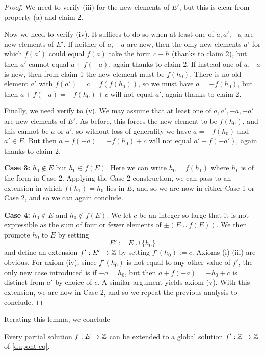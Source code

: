 \begin{proof}
We need to verify (iii) for the new elements of $E'$, but this is clear from property (a) and claim 2.

Now we need to verify (iv).  It suffices to do so when at least one of $a,a',-a$ are new elements of $E'$.  If neither of $a$, $-a$ are new, then the only new elements $a'$ for which $f(a')$ could equal $f(a)$ take the form $c-h$ (thanks to claim 2), but then $a'$ cannot equal $a+f(-a)$, again thanks to claim 2.  If instead one of $a, -a$ is new, then from claim 1 the new element must be $f(h_0)$.  There is no old element $a'$ with $f(a') = c = f(f(h_0))$, so we must have $a = -f(h_0)$, but then $a + f(-a) = -f(h_0)+c$ will not equal $a'$, again thanks to claim 2.

Finally, we need verify to (v).  We may assume that at least one of $a,a',-a,-a'$ are new elements of $E'$.  As before, this forces the new element to be $f(h_0)$, and this cannot be $a$ or $a'$, so without loss of generality we have $a = -f(h_0)$ and $a' \in E$.  But then $a + f(-a) = -f(h_0)+c$ will not equal $a' + f(-a')$, again thanks to claim 2.

{\bf Case 3:} $h_0 \not \in E$ but $h_0 \in f(E)$.  Here we can write $h_0 = f(h_1)$ where $h_1$ is of the form in Case 2.  Applying the Case 2 construction, we can pass to an extension in which $f(h_1) = h_0$ lies in $E$, and so we are now in either Case 1 or Case 2, and so we can again conclude.

{\bf Case 4:} $h_0 \not \in E$ and $h_0 \not \in f(E)$.  We let $c$ be an integer so large that it is not expressible as the sum of four or fewer elements of $\pm (E \cup f(E))$.  We then promote $h_0$ to $E$ by setting
$$E' := E \cup \{h_0\}$$
and define an extension $f': E' \to \mathbb{Z}$ by setting $f'(h_0) := c$.  Axioms (i)-(iii) are obvious.  For axiom (iv), since $f'(h_0)$ is not equal to any other value of $f'$, the only new case introduced is if $-a = h_0$, but then $a+f(-a) = -h_0+c$ is distinct from $a'$ by choice of $c$.  A similar argument yields axiom (v).  With this extension, we are now in Case 2, and so we repeat the previous analysis to conclude.
\end{proof}

Iterating this lemma, we conclude

\begin{corollary}\label{dupont-iter} Every partial solution $f: E \to \mathbb{Z}$ can be extended to a global solution $f': \mathbb{Z} \to\mathbb{Z}$ of \eqref{dupont-eq}.
\end{corollary}

